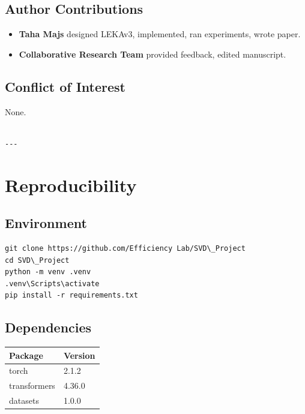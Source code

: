 \subsection{Author Contributions}

\begin{itemize}
\item \textbf{Taha Majs} designed LEKAv3, implemented, ran experiments, wrote paper.
\item \textbf{Collaborative Research Team} provided feedback, edited manuscript.

\end{itemize}
\subsection{Conflict of Interest}

None.
\begin{lstlisting}

---
\end{lstlisting}

\section{Reproducibility}

\subsection{Environment}

\begin{lstlisting}
git clone https://github.com/Efficiency Lab/SVD\_Project
cd SVD\_Project
python -m venv .venv
.venv\Scripts\activate
pip install -r requirements.txt
\end{lstlisting}

\subsection{Dependencies}

\begin{table}[H]
\centering
\small
\begin{tabular}{ll}
\toprule
\textbf{Package} & \textbf{Version} \\
\midrule
torch & 2.1.2 \\
transformers & 4.36.0 \\
datasets & 1.0.0 \\
\bottomrule
\end{tabular}
\end{table}

